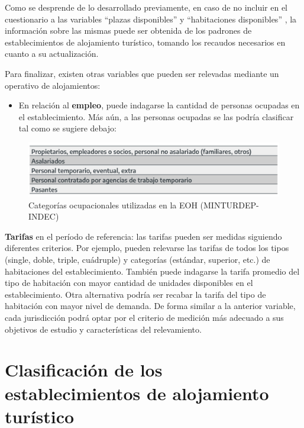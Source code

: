 \documentclass[
]{book}
\providecommand{\tightlist}{%
  \setlength{\itemsep}{0pt}\setlength{\parskip}{0pt}}
\begin{document}
Como se desprende de lo desarrollado previamente, en caso de no incluir en el cuestionario a las variables ``plazas disponibles'' y ``habitaciones disponibles'' , la información sobre las mismas puede ser obtenida de los padrones de establecimientos de alojamiento turístico, tomando los recaudos necesarios en cuanto a su actualización.

Para finalizar, existen otras variables que pueden ser relevadas mediante un operativo de alojamientos:

\begin{itemize}
\tightlist
\item
  En relación al \textbf{empleo}, puede indagarse la cantidad de personas ocupadas en el establecimiento. Más aún, a las personas ocupadas se las podría clasificar tal como se sugiere debajo:
\end{itemize}

\begin{figure}

{\centering \includegraphics[width=1\linewidth]{imagenes/tabla_5} 

}

\caption{Categorías ocupacionales utilizadas en la EOH (MINTURDEP-INDEC)}\label{fig:ocupados}
\end{figure}

\textbf{Tarifas} en el período de referencia: las tarifas pueden ser medidas siguiendo diferentes criterios. Por ejemplo, pueden relevarse las tarifas de todos los tipos (single, doble, triple, cuádruple) y categorías (estándar, superior, etc.) de habitaciones del establecimiento. También puede indagarse la tarifa promedio del tipo de habitación con mayor cantidad de unidades disponibles en el establecimiento. Otra alternativa podría ser recabar la tarifa del tipo de habitación con mayor nivel de demanda. De forma similar a la anterior variable, cada jurisdicción podrá optar por el criterio de medición más adecuado a sus objetivos de estudio y características del relevamiento.\\

\hypertarget{clasificaciuxf3n-de-los-establecimientos-de-alojamiento-turuxedstico}{%
\section{Clasificación de los establecimientos de alojamiento turístico}\label{clasificaciuxf3n-de-los-establecimientos-de-alojamiento-turuxedstico}}
\end{document}
